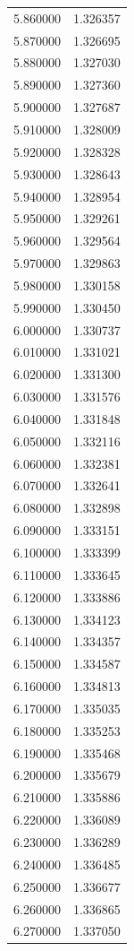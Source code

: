 \begin{tabular}{rr}
5.860000 & 1.326357 \\
5.870000 & 1.326695 \\
5.880000 & 1.327030 \\
5.890000 & 1.327360 \\
5.900000 & 1.327687 \\
5.910000 & 1.328009 \\
5.920000 & 1.328328 \\
5.930000 & 1.328643 \\
5.940000 & 1.328954 \\
5.950000 & 1.329261 \\
5.960000 & 1.329564 \\
5.970000 & 1.329863 \\
5.980000 & 1.330158 \\
5.990000 & 1.330450 \\
6.000000 & 1.330737 \\
6.010000 & 1.331021 \\
6.020000 & 1.331300 \\
6.030000 & 1.331576 \\
6.040000 & 1.331848 \\
6.050000 & 1.332116 \\
6.060000 & 1.332381 \\
6.070000 & 1.332641 \\
6.080000 & 1.332898 \\
6.090000 & 1.333151 \\
6.100000 & 1.333399 \\
6.110000 & 1.333645 \\
6.120000 & 1.333886 \\
6.130000 & 1.334123 \\
6.140000 & 1.334357 \\
6.150000 & 1.334587 \\
6.160000 & 1.334813 \\
6.170000 & 1.335035 \\
6.180000 & 1.335253 \\
6.190000 & 1.335468 \\
6.200000 & 1.335679 \\
6.210000 & 1.335886 \\
6.220000 & 1.336089 \\
6.230000 & 1.336289 \\
6.240000 & 1.336485 \\
6.250000 & 1.336677 \\
6.260000 & 1.336865 \\
6.270000 & 1.337050 \\

\end{tabular}
